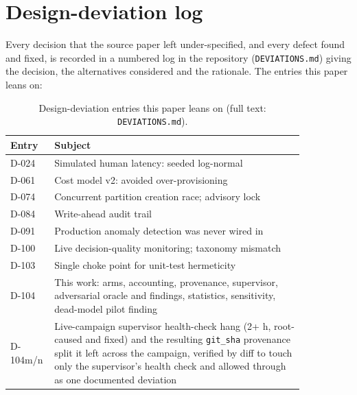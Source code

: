 \section{Design-deviation log}\label{app:deviations}

Every decision that the source paper left under-specified, and every defect found and fixed, is
recorded in a numbered log in the repository (\texttt{DEVIATIONS.md}) giving the decision, the
alternatives considered and the rationale. The entries this paper leans on:

\begin{table}[t]
\centering
\caption{Design-deviation entries this paper leans on (full text: \texttt{DEVIATIONS.md}).}
\label{tab:deviations}
\small
\begin{tabular}{@{}lp{0.85\linewidth}@{}}
\toprule
Entry & Subject \\
\midrule
D-024 & Simulated human latency: seeded log-normal \\
D-061 & Cost model v2: avoided over-provisioning \\
D-074 & Concurrent partition creation race; advisory lock \\
D-084 & Write-ahead audit trail \\
D-091 & Production anomaly detection was never wired in \\
D-100 & Live decision-quality monitoring; taxonomy mismatch \\
D-103 & Single choke point for unit-test hermeticity \\
D-104 & This work: arms, accounting, provenance, supervisor, adversarial oracle and findings, statistics, sensitivity, dead-model pilot finding \\
D-104m/n & Live-campaign supervisor health-check hang (2+ h, root-caused and fixed) and the resulting \texttt{git\_sha} provenance split it left across the campaign, verified by diff to touch only the supervisor's health check and allowed through as one documented deviation \\
\bottomrule
\end{tabular}
\end{table}
